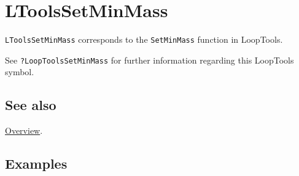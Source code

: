 \documentclass[../FeynHelpersManual.tex]{subfiles}
\begin{document}
\hypertarget{ltoolssetminmass}{
\section{LToolsSetMinMass}\label{ltoolssetminmass}}

\texttt{LToolsSetMinMass} corresponds to the \texttt{SetMinMass}
function in LoopTools.

See \texttt{?LoopTools\textasciigrave SetMinMass} for further
information regarding this LoopTools symbol.

\subsection{See also}

\hyperlink{toc}{Overview}.

\subsection{Examples}
\end{document}
